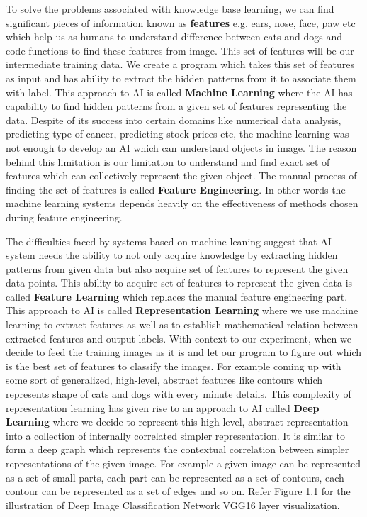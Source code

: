\documentclass[a4paper]{article}
\begin{document}
To solve the problems associated with knowledge base learning, we can find significant pieces of information known as \textbf{features} e.g. ears, nose, face, paw etc which help us as humans to understand difference between cats and dogs and code functions to find these features from image. This set of features will be our intermediate training data. We create a program which takes this set of features as input and has ability to extract the hidden patterns from it to associate them with label. This approach to AI is called \textbf{Machine Learning} where the AI has capability to find hidden patterns from a given set of features representing the data. Despite of its success into certain domains like numerical data analysis, predicting type of cancer, predicting stock prices etc, the machine learning was not enough to develop an AI which can understand objects in image. The reason behind this limitation is our limitation to understand and find exact set of features which can collectively represent the given object. The manual process of finding the set of features is called \textbf{Feature Engineering}. In other words the machine learning systems depends heavily on the effectiveness of methods chosen during feature engineering.  

The difficulties faced by systems based on machine leaning suggest that AI system needs the ability to not only acquire knowledge by extracting hidden patterns from given data but also acquire set of features to represent the given data points. This ability to acquire set of features to represent the given data is called \textbf{Feature Learning} which replaces the manual feature engineering part. This approach to AI is called \textbf{Representation Learning} where we use machine learning to extract features as well as to establish mathematical relation between extracted features and output labels. With context to our experiment, when we decide to feed the training images as it is and let our program to figure out which is the best set of features to classify the images. For example coming up with some sort of generalized, high-level, abstract features like contours which represents shape of cats and dogs with every minute details. This complexity of representation learning has given rise to an approach to AI called \textbf{Deep Learning} where we decide to represent this high level, abstract representation into a collection of internally correlated simpler representation. It is similar to form a deep graph which represents the contextual correlation between simpler representations of the given image. For example a given image can be represented as a set of small parts, each part can be represented as a set of contours, each contour can be represented as a set of edges and so on. Refer Figure 1.1 for the illustration of Deep Image Classification Network VGG16 layer visualization.         
\end{document}
